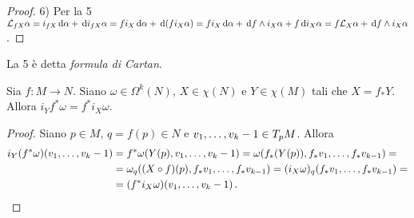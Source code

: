 \begin{proof}
	6) Per la 5 $\Lie_{fX}\alpha = i_{fX} \de \alpha + \de i_{fX} \alpha = f i_X \de \alpha + \de (fi_X\alpha) = f i_X\de \alpha + \de f \wedge i_X\alpha + f \de i_X\alpha = f\Lie_X \alpha + \de f \wedge i_X\alpha$.
\end{proof}

La 5 è detta \emph{formula di Cartan}.

\begin{proposition}
	Sia $f:M\to N$. Siano $\omega \in \Omega^k(N)$, $X \in \chi(N)$ e $Y \in \chi(M)$ tali che $X = f_*Y$. Allora $i_Yf^*\omega = f^* i_X\omega$.
\end{proposition}
\begin{proof}
	Siano $p\in M$, $q=f(p)\in N$ e $\seqb v{k-1}, \in T_pM$. Allora
	\begin{align*}
		i_Y(f^*\omega)(\seqb v{k-1},) &= f^* \omega (Y(p), \seqb v{k-1},) = \omega (f_*(Y(p)), f_*v_1,\ldots, f_*v_{k-1}) = \\
		&= \omega_q((X\circ f)(p),f_*v_1,\ldots, f_*v_{k-1}) = (i_X\omega)_q (f_*v_1,\ldots, f_*v_{k-1}) =\\
		& =(f^*i_X\omega)(\seqb v{k-1},) \punto 
	\end{align*}
\end{proof}

